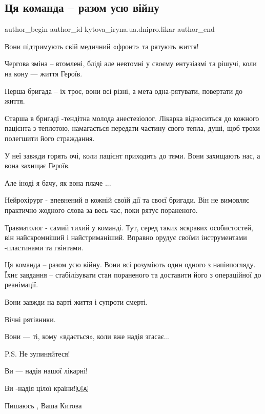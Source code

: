  
 
 
 
 

\subsection{Ця команда – разом усю війну}
\label{sec:12_01_2023.fb.kytova_iryna.ua.dnipro.likar.2.tsya_komanda___razom}

\ifcmt
 author_begin
   author_id kytova_iryna.ua.dnipro.likar
 author_end
\fi

Вони підтримують свій медичний «фронт» та рятують життя!

Чергова зміна – втомлені, бліді але невтомні у своєму ентузіазмі та рішучі,
коли на кону — життя Героїв.

Перша бригада – їх троє, вони всі різні, а мета одна-рятувати, повертати до
життя.

Старша  в бригаді -тендітна молода анестезіолог. Лікарка відноситься до кожного
пацієнта з теплотою, намагається передати частину свого тепла, душі, щоб трохи
полегшити його страждання.

У неї завжди  горять очі, коли пацієнт  приходить до тями. Вони захищають нас,
а вона захищає Героїв. 

Але іноді я бачу, як вона плаче ... 

Нейрохірург - впевнений в кожній своїй дії та своєї бригади. Він не вимовляє
практично жодного слова за весь час, поки рятує пораненого.

Травматолог - самий тихий у команді. Тут, серед таких яскравих особистостей,
він найскромніший і найстриманіший. Вправно орудує своїми інструментами
-пластинами та гвінтами.

Ця команда – разом усю війну. Вони всі розуміють один одного з напівпогляду.
Їхнє завдання – стабілізувати стан пораненого та доставити його з операційної
до реанімації.

Вони завжди на варті життя і супроти смерті. 

Вічні рятівники. 

Вони — ті, кому  «вдається», коли вже  надія згасає...

P.S. Не зупиняйтеся! 

Ви — надія нашої лікарні!      

Ви -надія цілої країни!🇺🇦

Пишаюсь , Ваша Китова 💙💛
